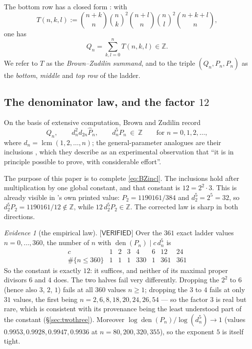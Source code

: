 \documentclass[11pt,reqno]{amsart}
\theoremstyle{plain}
\theoremstyle{definition}
\theoremstyle{remark}
\newtheorem{evidence}[theorem]{Evidence}
\numberwithin{equation}{section}
\newcommand{\ZZ}{\mathbb{Z}}
\newcommand{\den}{\operatorname{den}}
\newcommand{\lcm}{\operatorname{lcm}}
\newcommand{\VERIFIED}{\textsf{[VERIFIED]}}
\begin{document}
The bottom row has a closed form \cite[(Q\_n)]{BZ}: with
\begin{equation}\label{eq:T}
T(n,k,l):=\binom{n+k}{n}\binom{n}{k}^{2}\binom{n+l}{n}\binom{n}{l}^{2}\binom{n+k+l}{n},
\end{equation}
one has
\begin{equation}\label{eq:BZQ}
Q_n=\sum_{k,l=0}^{n}T(n,k,l)\in\ZZ .
\end{equation}
We refer to $T$ as the \emph{Brown--Zudilin summand}, and to the triple $(Q_n,\hat P_n,P_n)$
as the \emph{bottom}, \emph{middle} and \emph{top row} of the ladder.

\subsection{The denominator law, and the factor \texorpdfstring{$12$}{12}}

On the basis of extensive computation, Brown and Zudilin record
\cite[(dn-totsym)]{BZ}
\begin{equation}\label{eq:BZincl}
Q_n,\qquad d_n^2d_{2n}\hat P_n,\qquad d_n^5P_n\ \in\ \ZZ
\qquad\text{for } n=0,1,2,\dots,
\end{equation}
where $d_n=\lcm(1,2,\dots,n)$; the general-parameter analogues are their inclusions
\cite[(incl), (sharp\_incl)]{BZ}, which they describe as an experimental observation that ``it
is in principle possible to prove, with considerable effort''.

The purpose of this paper is to complete \eqref{eq:BZincl}. The inclusions hold after
multiplication by one global constant, and that constant is $12=2^2\cdot3$. This is already
visible in \cite{BZ}'s own printed value: $P_2=1190161/384$ and $d_2^5=2^5=32$, so
$d_2^5P_2=1190161/12\notin\ZZ$, while $12\,d_2^5P_2\in\ZZ$. The corrected law is sharp in
both directions.

\begin{evidence}[the empirical law]\label{ev:law12}
$\VERIFIED$ Over the $361$ exact ladder values $n=0,\dots,360$, the number of $n$ with
$\den(P_n)\mid c\,d_n^5$ is
\[
\begin{array}{c|ccccccc}
c & 1 & 2 & 3 & 4 & 6 & 12 & 24\\\hline
\#\{n\le360\} & 1 & 1 & 1 & 330 & 1 & 361 & 361
\end{array}
\]
So the constant is exactly $12$: it suffices, and neither of its maximal proper divisors $6$
and $4$ does. The two halves fail very differently. Dropping the $2^2$ to $6$ (hence also $3$,
$2$, $1$) fails at all $360$ values $n\ge1$; dropping the $3$ to $4$ fails at only $31$ values,
the first being $n=2,6,8,18,20,24,26,54$ --- so the factor $3$ is real but rare, which is
consistent with its provenance being the least understood part of the constant
(\S\ref{sec:twothree}). Moreover $\log\den(P_n)/\log(d_n^5)\to1$ (values
$0.9953,0.9928,0.9947,0.9936$ at $n=80,200,320,355$), so the exponent $5$ is itself tight.
\end{evidence}
\end{document}
